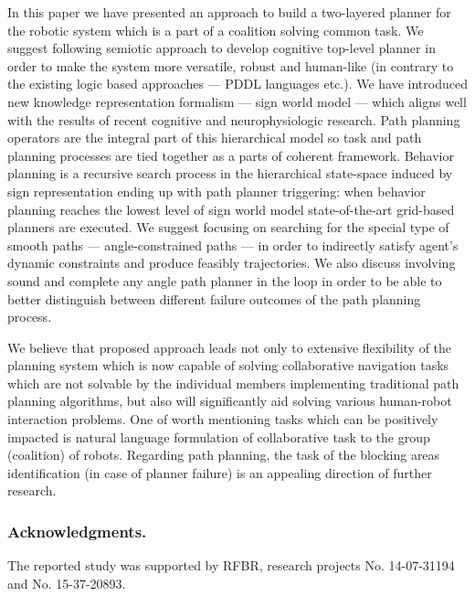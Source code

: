 \documentclass[runningheads,a4paper]{llncs}
\begin{document}
In this paper we have presented an approach to build a two-layered planner for the robotic system which is a part of a coalition solving common task. We suggest following semiotic approach to develop cognitive top-level planner in order to make the system more versatile, robust and human-like (in contrary to the existing logic based approaches --- PDDL languages etc.). We have introduced new knowledge representation formalism --- sign world model --- which aligns well with the results of recent cognitive and neurophysiologic research. Path planning operators are the integral part of this hierarchical model so task and path planning processes are tied together as a parts of coherent framework. Behavior planning is a recursive search process in the hierarchical state-space induced by sign representation ending up with path planner triggering: when behavior planning reaches the lowest level of sign world model state-of-the-art grid-based planners are executed. We suggest focusing on searching for the special type of smooth paths --- angle-constrained paths --- in order to indirectly satisfy agent's dynamic constraints and produce feasibly trajectories. We also discuss involving sound and complete any angle path planner in the loop in order to be able to better distinguish between different failure outcomes of the path planning process.

We believe that proposed approach leads not only to extensive flexibility of the planning system which is now capable of solving collaborative navigation tasks which are not solvable by the individual members implementing traditional path planning algorithms, but also will significantly aid solving various human-robot interaction problems. One of worth mentioning tasks which can be positively impacted is natural language formulation of collaborative task to the group (coalition) of robots. Regarding path planning, the task of the blocking areas identification (in case of planner failure) is an appealing direction of further research.


\subsubsection*{Acknowledgments.} The reported study was supported by RFBR, research projects No. 14-07-31194 and No. 15-37-20893.
\end{document}
